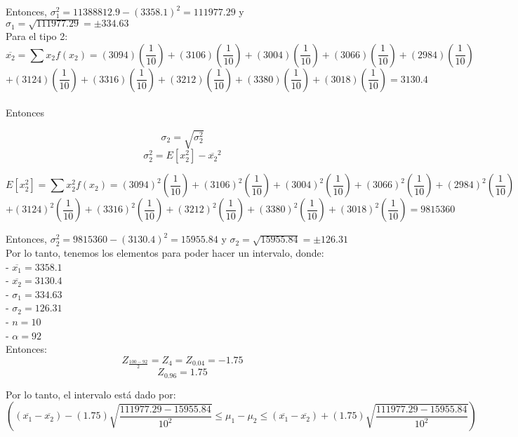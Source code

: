 \begin{enumerate}
    Entonces, $ \sigma_{1}^2 = 11388812.9 -(3358.1)^2 = 111977.29 $ y $\sigma_{1} = \sqrt{111977.29} = \pm 334.63 $ \\
    
    Para el tipo 2:
    $$ \overline{x_{2}} = \sum x_{2}f(x_{2})= (3094)\left( \frac{1}{10} \right) + (3106)\left( \frac{1}{10} \right) + (3004)\left( \frac{1}{10} \right) + (3066)\left( \frac{1}{10} \right) + (2984)\left( \frac{1}{10} \right) $$ $$ +  (3124)\left( \frac{1}{10} \right) + (3316)\left( \frac{1}{10} \right)+ (3212)\left( \frac{1}{10} \right) + (3380)\left( \frac{1}{10} \right) + (3018)\left( \frac{1}{10} \right) = 3130.4 $$
    \\
    Entonces
    
    $$ \sigma_{2} = \sqrt{\sigma_{2}^2} $$
    $$ \sigma_{2}^2 = E[x_{2}^2] - \overline{x_{2}}^2 $$
    
    $$ E[x_{2}^2] = \sum x_{2}^2f(x_{2})= (3094)^2\left( \frac{1}{10} \right) + (3106)^2\left( \frac{1}{10} \right) + (3004)^2\left( \frac{1}{10} \right) + (3066)^2\left( \frac{1}{10} \right) + (2984)^2\left( \frac{1}{10} \right) $$ $$ +  (3124)^2\left( \frac{1}{10} \right) +(3316)^2\left( \frac{1}{10} \right)+ (3212)^2\left( \frac{1}{10} \right) + (3380)^2\left( \frac{1}{10} \right) + (3018)^2\left( \frac{1}{10} \right) = 9815360 $$
    
    Entonces, $ \sigma_{2}^2 = 9815360 -(3130.4)^2 = 15955.84 $ y $\sigma_{2} = \sqrt{15955.84} = \pm 126.31 $ \\
    
    Por lo tanto, tenemos los elementos para poder hacer un intervalo, donde: \\
    - $ \overline{x_{1}} = 3358.1$ \\ 
    - $ \overline{x_{2}} = 3130.4 $ \\
    - $ \sigma_{1} = 334.63 $ \\ 
    - $ \sigma_{2} = 126.31 $ \\ 
    - $ n = 10 $ \\ 
    - $  \alpha = 92$ \\
    
    Entonces: 
    $$ Z_{ \frac{100-92}{2} }  =  Z_{4} = Z_{0.04} = -1.75 $$  $$ Z_{0.96} = 1.75 $$
    
    Por lo tanto, el intervalo está dado por: 
    $$ \left( ( \overline{x_{1}} - \overline{x_{2}} ) - \left( 1.75 \right) \sqrt{\frac{111977.29-15955.84}{10^2}} \leq \mu_{1} - \mu_{2} \leq    (\overline{x_{1}} - \overline{x_{2}}) + \left( 1.75 \right) \sqrt{\frac{111977.29-15955.84}{10^2}}         \right)  $$
    

\end{enumerate}
